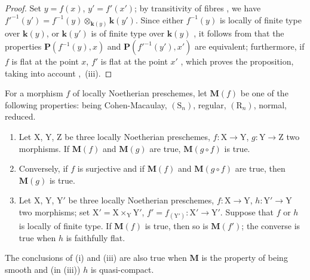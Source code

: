 \begin{proof}
Set $y=f(x)$, $y'=f'(x')$; by transitivity of fibres , we have $f'^{-1}(y')=f^{-1}(y)\otimes_{\boldsymbol{k}(y)}\boldsymbol{k}(y')$. Since either $f^{-1}(y)$ is locally of finite type over $\boldsymbol{k}(y)$, or $\boldsymbol{k}(y')$ is of finite type over $\boldsymbol{k}(y)$ , it follows from  that the properties $\boldsymbol{P}(f^{-1}(y),x)$ and $\boldsymbol{P}(f'^{-1}(y'),x')$ are equivalent; furthermore, if $f$ is flat at the point $x$, $f'$ is flat at the point $x'$ , which proves the proposition, taking into account ,~(iii).
\end{proof}

\begin{proposition}[6.8.3]
\label{IV.6.8.3}
For a morphism $f$ of locally Noetherian preschemes, let $\boldsymbol{M}(f)$ be one of the following properties: being Cohen-Macaulay, $(\mathrm{S}_n)$, regular, $(\mathrm{R}_n)$, normal, reduced.
\begin{enumerate}[label=(\roman*)]
  \item Let $\mathrm{X}$, $\mathrm{Y}$, $\mathrm{Z}$ be three locally Noetherian preschemes, $f:\mathrm{X}\to\mathrm{Y}$, $g:\mathrm{Y}\to\mathrm{Z}$ two morphisms. If $\boldsymbol{M}(f)$ and $\boldsymbol{M}(g)$ are true, $\boldsymbol{M}(g\circ f)$ is true.
  \item Conversely, if $f$ is surjective and if $\boldsymbol{M}(f)$ and $\boldsymbol{M}(g\circ f)$ are true, then $\boldsymbol{M}(g)$ is true.
  \item Let $\mathrm{X}$, $\mathrm{Y}$, $\mathrm{Y}'$ be three locally Noetherian preschemes, $f:\mathrm{X}\to\mathrm{Y}$, $h:\mathrm{Y}'\to\mathrm{Y}$ two morphisms; set $\mathrm{X}'=\mathrm{X}\times_\mathrm{Y}\mathrm{Y}'$, $f'=f_{(\mathrm{Y}')}:\mathrm{X}'\to\mathrm{Y}'$. Suppose that $f$ or $h$ is locally of finite type. If $\boldsymbol{M}(f)$ is true, then so is $\boldsymbol{M}(f')$; the converse is true when $h$ is faithfully flat.
\end{enumerate}
The conclusions of (i) and (iii) are also true when $\boldsymbol{M}$ is the property of being smooth and (in (iii)) $h$ is quasi-compact.
\end{proposition}

